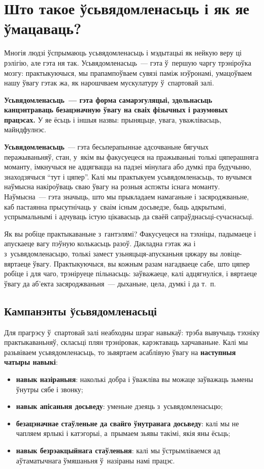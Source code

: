 \section{Што такое ўсьвядомленасьць і як яе ўмацаваць?}

Многія людзі ўспрымаюць усьвядомленасьць і мэдытацыі як нейкую веру ці рэлігію, але гэта ня так. Усьвядомленасьць~--- гэта ў~першую чаргу трэніроўка мозгу: практыкуючыся, мы прапампоўваем сувязі паміж нэўронамі, умацоўваем нашу ўвагу гэтак жа, як нарошчваем мускулатуру ў~спартовай залі.

\textbf{Усьвядомленасьць~--- гэта форма самарэгуляцыі, здольнасьць канцэнтраваць безацэначную ўвагу на сваіх фізычных і разумовых працэсах.} У яе ёсьць і іншыя назвы: прыняцьце, увага, уважлівасьць, майндфулнэс.

\textbf{Усьвядомленасьць}~--- гэта бесьперапыннае адсочваньне бягучых перажываньняў, стан, у~якім вы факусуецеся на пражываньні толькі цяперашняга моманту, імкнучыся не адцягвацца на падзеі мінулага або думкі пра будучыню, знаходзячыся ``тут і цяпер''. Калі мы практыкуем усьвядомленасьць, то вучымся наўмысна накіроўваць сваю ўвагу на розныя аспэкты існага моманту. Наўмысна~--- гэта значыць, што мы прыкладаем намаганьне і засяроджваньне, каб пастаянна прысутнічаць у~сваім існым досьведзе, быць адкрытымі, успрымальнымі і адчуваць істую цікавасьць да сваёй сапраўднасьці-сучаснасьці.


Як вы робіце практыкаваньне з~гантэлямі? Факусуецеся на тэхніцы, падымаеце і апускаеце вагу пэўную колькасьць разоў. Дакладна гэтак жа і з~усьвядомленасьцю, толькі замест узьняцьця-апусканьня цяжару вы ловіце-вяртаеце ўвагу. Практыкуючыся, вы кожным разам нагадваеце сабе, што цяпер робіце і для чаго, трэніруеце пільнасьць: заўважаеце, калі адцягнуліся, і вяртаеце ўвагу да аб'екта засяроджваньня~--- дыханьне, цела, думкі і да т.~п.

\subsection*{Кампанэнты ўсьвядомленасьці}

Для прагрэсу ў~спартовай залі неабходны шэраг навыкаў: трэба вывучыць тэхніку практыкаваньняў, скласьці плян трэніровак, карэктаваць харчаваньне. Калі мы разьвіваем усьвядомленасьць, то зьвяртаем асаблівую ўвагу на \textbf{наступныя чатыры навыкі}: 
\begin{itemize}
  \item \textbf{навык назіраньня}: наколькі добра і ўважліва вы можаце заўважаць зьмены ўнутры сябе і звонку;
  \item \textbf{навык апісаньня досьведу}: уменьне дзеяць з~усьвядомленасьцю;
  \item \textbf{безацэначнае стаўленьне да свайго ўнутранага досьведу}: калі мы не чапляем ярлыкі і катэгорыі, а~прымаем зьявы такімі, якія яны ёсьць;
  \item \textbf{навык безрэакцыйнага стаўленьня}: калі мы ўстрымліваемся ад аўтаматычнага ўмяшаньня ў~назіраны намі працэс.
\end{itemize}

